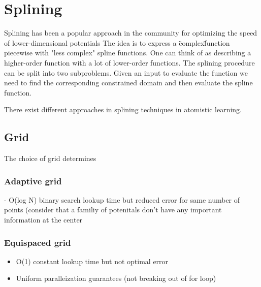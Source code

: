 \chapter{Splining}
\label{sec:splining}
Splining has been a popular approach in the community for optimizing the speed of lower-dimensional potentials\cite{todo}
The idea is to express a \"complex\" function piecewise with "less complex" spline functions.
One can think of as describing a higher-order function with a lot of lower-order functions.
The splining procedure can be split into two subproblems.
Given an input to evaluate the function we need to find the corresponding constrained domain and then evaluate the spline function.

There exist different approaches in splining techniques in atomistic learning.

\section{Grid}
The choice of grid determines

\subsection{Adaptive grid}

- O(log N) binary search lookup time but reduced error for same number of points (consider that a familiy of potenitals don't have any important information at the center
\subsection{Equispaced grid}
\begin{itemize}
\item O(1) constant lookup time but not optimal error
\item Uniform paralleization guarantees (not breaking out of for loop)
\end{itemize}

